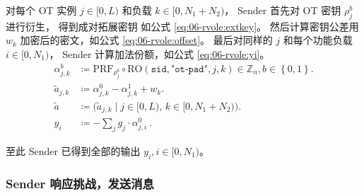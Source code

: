 对每个 OT 实例 $j\in [0, L)$ 和负载 $k\in[0, N_1+N_2)$，
Sender 首先对 OT 密钥 $\rho_j^b$ 进行衍生，
得到成对拓展密钥 如公式 \eqref{eq:06-rvole:extkey}。
然后计算密钥公差用 $w_k$ 加密后的密文，如公式 \eqref{eq:06-rvole:offset}。
最后对同样的 $j$ 和每个功能负载 $i \in [0, N_1)$，
Sender 计算加法份额，如公式 \eqref{eq:06-rvole:yi}。
\begin{align}\label{eq:06-rvole:extkey}
  \tag{extkey}
  \alpha^b_{j,k}  & \coloneq \mathrm{PRF}_{\rho_j^b}
  \circ \mathrm{RO}(\mathtt{sid},\texttt{"ot-pad"},j,k)
  \in \mathbb Z_n,
  b\in\left\{0,1\right\}.
  \\
  \tilde{a}_{j,k} & \coloneq \alpha^0_{j,k}-\alpha^1_{j,k}+w_{k}.
  \\
  \label{eq:06-rvole:offset}
  \tag{offset}
  \tilde a        & \coloneq \bigl(\tilde a_{j,k} \mid j\in[0,L),\,k\in[0,N_1+N_2)\bigr).
  \\
  \label{eq:06-rvole:yi}
  \tag{yi}
  y_{i}           & \coloneq -\sum_j g_j\cdot \alpha^0_{j,i} ~.
\end{align}

至此 Sender 已得到全部的输出 $y_i, i\in[0, N_1)$。

\subsubsection{Sender 响应挑战，发送消息}
\label{sec:rvole:challenge-response}

